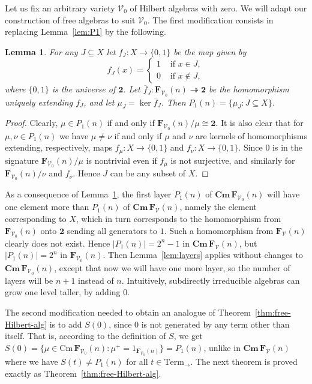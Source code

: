 \documentclass{amsart}
\newtheorem{lemma}[theorem]{Lemma}
\newcommand{\alg}[1]{\mathbf{#1}}
\newcommand{\ov}[1]{\overline{#1}}
\newcommand{\FV}{\alg{F}_\mathcal{V}}
\newcommand{\FVo}{\alg{F}_{\mathcal{V}_0}}
\newcommand{\Cm}[1]{\mathbf{Cm}\, #1}
\newcommand{\cm}[1]{\mathrm{Cm}\, #1}
\def\ra{\rightarrow}
\begin{document}
Let us fix an arbitrary variety
$\mathcal{V}_0$ of Hilbert algebras with zero. We will adapt our
construction of free algebras to suit $\mathcal{V}_0$.
The first modification consists in replacing Lemma~\ref{lem:P1} by the
following. 

\begin{lemma}\label{lem:P1-with-0}
For any $J\subseteq X$ let
$f_J\colon X\to\{0,1\}$ be the map given by
$$
f_J(x) =\begin{cases}
  1 & \text{ if } x\in J,\\
  0 & \text{ if } x\notin J,
\end{cases}
$$
where $\{0,1\}$ is the universe of $\alg{2}$.
Let $\ov{f}_J\colon \FVo(n)\twoheadrightarrow \mathbf{2}$
be the homomorphism uniquely extending $f_J$, and let
$\mu_J = \ker \ov{f}_J$. Then
$P_1(n) = \{\mu_J: J\subseteq X\}$.
\end{lemma}  
  
  
\begin{proof}
Clearly, $\mu\in P_1(n)$ if and only if
$\FVo(n)/\mu \cong \alg{2}$. It is also clear that
for $\mu,\nu\in P_1(n)$ we have $\mu\neq\nu$ if and only if
$\mu$ and $\nu$ are kernels of homomorphisms
extending, respectively, maps $f_\mu\colon X\to \{0,1\}$ and
$f_\nu\colon X\to \{0,1\}$. Since $0$ is in the signature
$\FVo(n)/\mu$ is nontrivial even if  
$f_\mu$ is not surjective, and similarly for $\FVo(n)/\nu$ and $f_\nu$. Hence
$J$ can be any subset of $X$. 
\end{proof}

As a consequence of Lemma~\ref{lem:P1-with-0}, the first layer
$P_1(n)$ of $\Cm{\FVo(n)}$ will have one element more than
$P_1(n)$ of $\Cm{\FV(n)}$, namely the element corresponding to
$X$, which in turn corresponds to the homomorphism from $\FVo(n)$
onto $\alg{2}$ sending all generators to $1$. Such a homomorphism from
$\FV(n)$ clearly does not exist. Hence $|P_1(n)| = 2^n-1$ 
in $\Cm\FV(n)$, but $|P_1(n)| = 2^n$ in $\FVo(n)$. 
Then Lemma~\ref{lem:layers} applies without
changes to $\Cm{\FVo(n)}$, 
except that now we will have one more layer, so the number of layers will be
$n+1$ instead of $n$. Intuitively, subdirectly irreducible algebras can
grow one level taller, by adding $0$.

The second modification needed to obtain an analogue of
Theorem~\ref{thm:free-Hilbert-alg} is to  
add $S(0)$, since $0$ is not generated by any term other than itself. That is,
according to the definition of $S$, we get
$S(0) = \{\mu\in\cm{\FVo(n)}: \mu^+ = 1_{\FVo(n)}\} =  P_1(n)$,
  unlike in $\Cm{\FV(n)}$ where we have $S(t)
\neq P_1(n)$ for all $t\in \mathrm{Term}_{\ra}$. The next theorem is
proved exactly as Theorem~\ref{thm:free-Hilbert-alg}.
 
\end{document}
